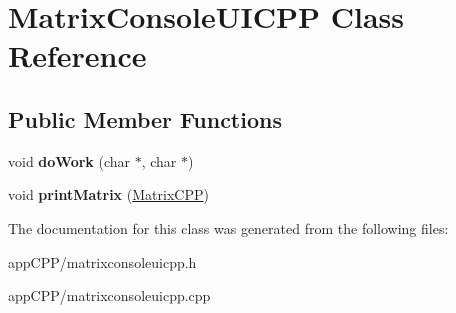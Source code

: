 \hypertarget{classMatrixConsoleUICPP}{\section{Matrix\-Console\-U\-I\-C\-P\-P Class Reference}
\label{classMatrixConsoleUICPP}
}
\subsection*{Public Member Functions}
\begin{DoxyCompactItemize}
\item 
\hypertarget{classMatrixConsoleUICPP_ab0044d76dfbcf421fa10ade07ba85833}{void {\bfseries do\-Work} (char $\ast$, char $\ast$)}\label{classMatrixConsoleUICPP_ab0044d76dfbcf421fa10ade07ba85833}

\item 
\hypertarget{classMatrixConsoleUICPP_a5aed2ba4c596c1cf98e8cb839e36b938}{void {\bfseries print\-Matrix} (\hyperlink{classMatrixCPP}{Matrix\-C\-P\-P})}\label{classMatrixConsoleUICPP_a5aed2ba4c596c1cf98e8cb839e36b938}

\end{DoxyCompactItemize}


The documentation for this class was generated from the following files\-:\begin{DoxyCompactItemize}
\item 
app\-C\-P\-P/matrixconsoleuicpp.\-h\item 
app\-C\-P\-P/matrixconsoleuicpp.\-cpp\end{DoxyCompactItemize}
